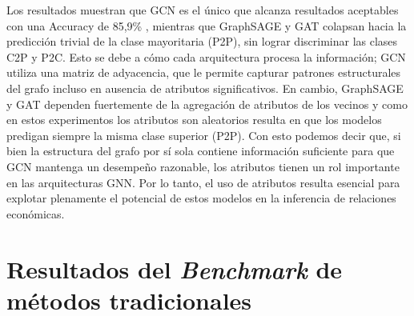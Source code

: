 Los resultados muestran que GCN es el único que alcanza resultados aceptables con una Accuracy de 85,9\% , mientras que GraphSAGE y GAT colapsan hacia la predicción trivial de la clase mayoritaria (P2P), sin lograr discriminar las clases C2P y P2C. Esto se debe a cómo cada arquitectura procesa la información; GCN utiliza una matriz de adyacencia, que le permite capturar patrones estructurales del grafo incluso en ausencia de atributos significativos. En cambio, GraphSAGE y GAT dependen fuertemente de la agregación de atributos de los vecinos y como en estos experimentos los atributos son aleatorios resulta en que los modelos predigan siempre la misma clase superior (P2P). Con esto podemos decir que, si bien la estructura del grafo por sí sola contiene información suficiente para que GCN mantenga un desempeño razonable, los atributos tienen un rol importante en las arquitecturas GNN. Por lo tanto, el uso de atributos resulta esencial para explotar plenamente el potencial de estos modelos en la inferencia de relaciones económicas.\\











\section{Resultados del \textit{Benchmark} de métodos tradicionales} \label{sec:benchmark_result_section}

